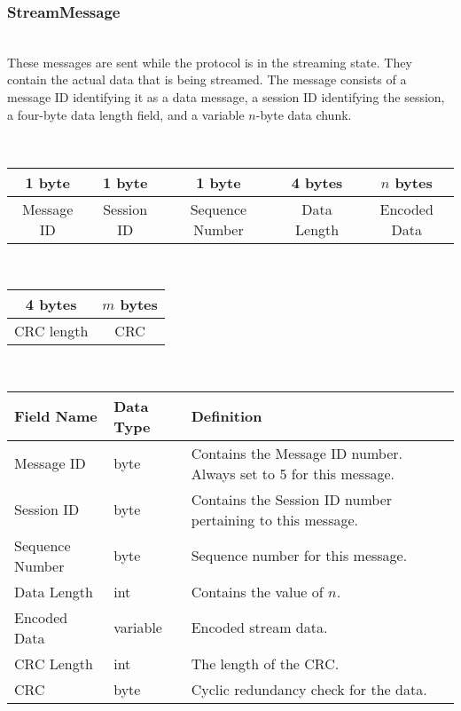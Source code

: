 \documentclass[12pt,letterpaper,titlepage]{article}
\begin{document}
\subsubsection{StreamMessage}
	\begin{description}
	\item[Description] \hfill \\
		These messages are sent while the protocol is in the streaming state. They contain the 
		actual data that is being streamed. The message consists of a message ID identifying it as a data message, a session ID identifying the session, a four-byte data length field, and a variable $n$-byte data chunk.
	\item[Message Format] \hfill \\
	\begin{tabular}{ | c | c | c | c | c | }
		\hline
		1 byte & 1 byte & 1 byte & 4 bytes & $n$ bytes \\
		\hline
		Message ID & Session ID & Sequence Number & Data Length & Encoded Data \\
		\hline
	\end{tabular}
	\item \hfill \\
	\begin{tabular}{ | c | c | }
		\hline
		4 bytes & $m$ bytes \\
		\hline
		CRC length & CRC \\
		\hline
	\end{tabular}
	\item[Message Field Definitions] \hfill \\
	\begin{tabular}{ | p{3cm} | p{1.5cm} | p{8cm} | }
		\hline
		Field Name & Data Type & Definition \\
		\hline
		Message ID & byte & Contains the Message ID number. 
					\newline Always set to 5 for this message. \\
		\hline
		Session ID & byte & Contains the Session ID number pertaining to this message. \\
        \hline
        Sequence Number & byte & Sequence number for this message. \\
		\hline
		Data Length & int & Contains the value of $n$. \\
		\hline
        Encoded Data & variable & Encoded stream data. \\
        \hline
        CRC Length & int & The length of the CRC. \\
        \hline
        CRC & byte & Cyclic redundancy check for the data. \\
        \hline
	\end{tabular}
	\end{description}
	
\end{document}
